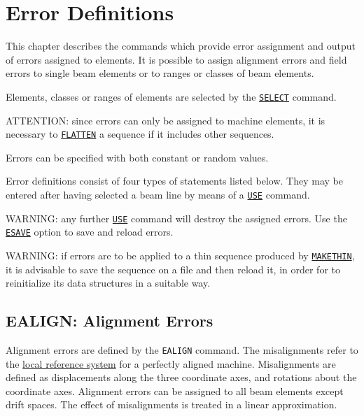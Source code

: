 
\chapter{Error Definitions}
\label{chap:error}
This chapter describes the commands which provide error assignment and
output of errors assigned to elements. It is possible to assign
alignment errors and field errors to single beam elements or to ranges
or classes of beam elements.

Elements, classes or ranges of elements are selected by the
\hyperref[sec:select]{\texttt{SELECT}} command.

ATTENTION: since errors can only be assigned to machine elements, it is
necessary to \hyperref[sec:flatten]{\texttt{FLATTEN}} a sequence
if it includes other sequences.

Errors can be specified with both constant or random values.

Error definitions consist of four types of statements listed below. They
may be entered after having selected a beam line by means of a
\hyperref[sec:use]{\texttt{USE}} command.  

WARNING: any further \hyperref[sec:use]{\texttt{USE}} command
will destroy the assigned errors. Use the
\hyperref[sec:esave]{\texttt{ESAVE}} option to save and reload errors.

WARNING: if errors are to be applied to a thin sequence produced by \hyperref[chap:makethin]{\texttt{MAKETHIN}}, it is advisable to save the sequence on a file and then reload it, in order for \madx to reinitialize its data structures in a suitable way.



%

\section{EALIGN: Alignment Errors} %
\label{sec:ealign}

Alignment errors are defined by the \texttt{EALIGN} command. 
The misalignments refer to the
\hyperref[sec:reference]{local reference system} for a
perfectly aligned machine.  
Misalignments are defined as displacements along the three coordinate
axes, and rotations about the coordinate axes. 
Alignment errors can be assigned to all beam elements except drift
spaces. 
The effect of misalignments is treated in a linear
approximation.

